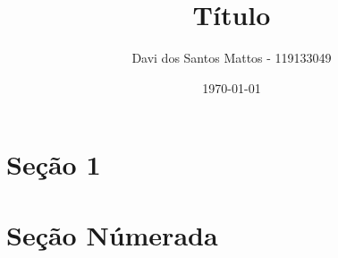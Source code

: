 \documentclass[12pt,a4paper]{article}
\title{Título}
\author{Davi dos Santos Mattos - 119133049}
\date{\today}
\begin{document}
\maketitle

\section*{Seção 1}
\hspace{1cm}
\lipsum[1]

\section{Seção Númerada}
\end{document}
